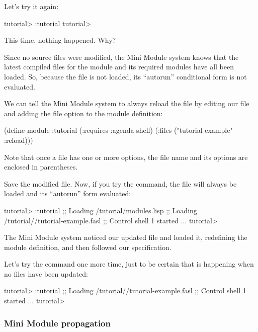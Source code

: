 \documentclass[10pt,twoside,english,pdftex]{article}
\begin{document}
Let's try it again:
%
\W\supp
\begin{example}
\textcolor{darkergray}{%
  tutorial> \textcolor{black}{:tutorial}
  tutorial>}
\end{example}
%
This time, nothing happened.  Why?

Since no source files were modified, the Mini Module system knows that the
latest compiled files for the  module and its required modules
have all been loaded.  So, because the  file is not
loaded, its ``autorun'' conditional form is not evaluated.

We can tell the Mini Module system to always reload the
 file by editing our  file and
adding the  file option to the  module
definition:
%
\W\supp
\begin{example}
\textcolor{darkergray}{%
  (define-module :tutorial
    (:requires :agenda-shell)
    (:files \textcolor{black}{(}"tutorial-example" \textcolor{black}{:reload})))}
\end{example}
%
Note that once a file has one or more options, the file name and its options
are enclosed in parentheses.

Save the modified  file. Now, if you try the
 command, the  file will always be
loaded and its ``autorun'' form evaluated:
%
\W\supp
\begin{example}
\textcolor{darkergray}{%
  tutorial> \textcolor{black}{:tutorial}
  ;; Loading /tutorial/modules.lisp
  ;; Loading /tutorial//tutorial-example.fasl
  ;; Control shell 1 started
     ...
  tutorial>}
\end{example}
%
The Mini Module system noticed our updated  file and loaded
it, redefining the  module definition, and then followed our
 specification.

Let's try the  command one more time, just to be certain that
 is happening when no files have been updated:
%
\W\supp
\begin{example}
\textcolor{darkergray}{%
  tutorial> \textcolor{black}{:tutorial}
  ;; Loading /tutorial//tutorial-example.fasl
  ;; Control shell 1 started
     ...
  tutorial>}
\end{example}

\subsubsection*{Mini Module propagation}
\end{document}
